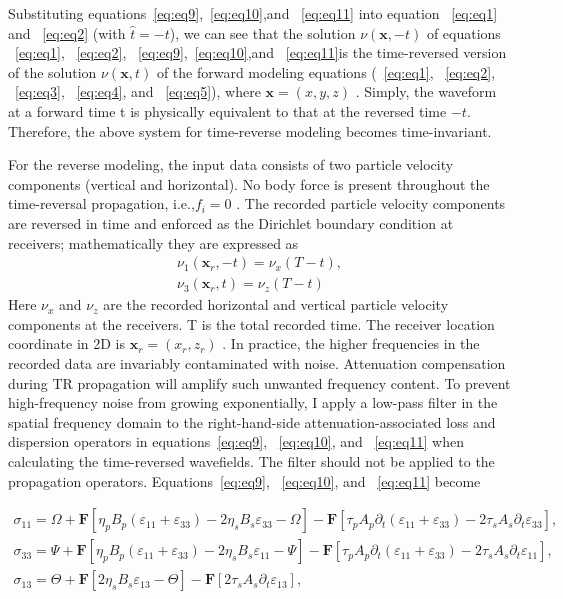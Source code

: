 Substituting equations~\ref{eq:eq9},~\ref{eq:eq10},and ~\ref{eq:eq11} into equation ~\ref{eq:eq1} and ~\ref{eq:eq2} (with $\hat{t}=-t $), we can see that the solution  $\nu(\mathbf{x},-t)$ of equations  ~\ref{eq:eq1}, ~\ref{eq:eq2}, ~\ref{eq:eq9},~\ref{eq:eq10},and ~\ref{eq:eq11}is the time-reversed version of the solution $\nu(\mathbf{x},t)$  of the forward modeling equations (~\ref{eq:eq1}, ~\ref{eq:eq2}, ~\ref{eq:eq3}, ~\ref{eq:eq4}, and ~\ref{eq:eq5}), where $\mathbf{x}=(x,y,z)$  . Simply, the waveform at a forward time t is physically equivalent to that at the reversed time $-t$. Therefore, the above system for time-reverse modeling becomes time-invariant.

For the reverse modeling, the input data consists of two particle velocity components (vertical and horizontal). No body force is present throughout the time-reversal propagation, i.e.,$f_i=0$ . The recorded particle velocity components are reversed in time and enforced as the Dirichlet boundary condition at receivers; mathematically they are expressed as
\begin{eqnarray}
\label{eq:eq12}  
 \nu_1(\mathbf{x}_r,-t)=\nu_x(T-t),\\
\nu_3(\mathbf{x}_r,t)=\nu_z(T-t)
\end{eqnarray}
Here $\nu_x$ and $\nu_z$ are the recorded horizontal and vertical particle velocity components at the receivers. T is the total recorded time. The receiver location coordinate in 2D is $\mathbf{x}_r=(x_r,z_r)$ .
In practice, the higher frequencies in the recorded data are invariably contaminated with noise. Attenuation compensation during TR propagation will amplify such unwanted frequency content. To prevent high-frequency noise from growing exponentially, I apply a low-pass filter in the spatial frequency domain to the right-hand-side attenuation-associated loss and dispersion operators in equations~\ref{eq:eq9}, ~\ref{eq:eq10}, and ~\ref{eq:eq11} when calculating the time-reversed wavefields. The filter should not be applied to the propagation operators. Equations~\ref{eq:eq9}, ~\ref{eq:eq10}, and ~\ref{eq:eq11} become

\begin{eqnarray}                     
\sigma _{11}=\Omega +\mathbf F\left [ \eta _pB_p(\varepsilon_{11}+\varepsilon_{33} )-2\eta _sB_s\varepsilon_{33} -\Omega \right ] - \mathbf F\left [ \tau _pA_p\partial _t (\varepsilon_{11}+\varepsilon_{33} )-2\tau _sA_s\partial _t \varepsilon_{33} \right ],\label{eq:eq13} \\                     
\sigma _{33}=\Psi+\mathbf F\left [ \eta _pB_p(\varepsilon_{11}+\varepsilon_{33} )-2\eta _sB_s\varepsilon_{11} -\Psi \right ] - \mathbf F\left [ \tau _pA_p\partial _t (\varepsilon_{11}+\varepsilon_{33} )-2\tau _sA_s\partial _t \varepsilon_{11} \right ],\label{eq:eq14} \\             
\sigma _{13}=\Theta + \mathbf F \left [ 2\eta _sB_s\varepsilon_{13} - \Theta \right ] - \mathbf F \left [ 2\tau _sA_s\partial _t \varepsilon_{13}\right ],\label{eq:eq15} 
\end{eqnarray}

